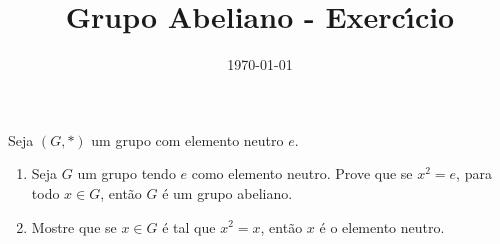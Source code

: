 \documentclass{beamer}
\title{Grupo Abeliano - Exerc{\'\i}cio}
\author[\autor]{\autor}
\institute[\instituto]{\instituto}
\date[]{\today}
\begin{document}


    \begin{frame}
        \begin{exercicio}
            Seja $(G,*)$ um grupo com elemento neutro $e$.
            \begin{enumerate}[label=({\alph*})]
                \item Seja $G$ um grupo tendo $e$ como elemento neutro. Prove que se
                $x^2 = e$, para todo $x\in G$, ent{\~a}o $G$ {\'e} um grupo abeliano.

                \item Mostre que se $x\in G$ {\'e} tal que $x^2 = x$, ent{\~a}o $x$ {\'e} o elemento neutro.
            \end{enumerate}
        \end{exercicio}
    \end{frame}
\end{document}
